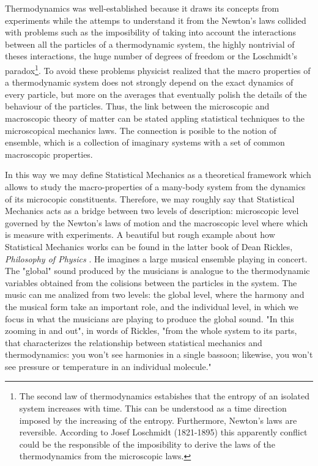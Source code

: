 \documentclass[a4paper,openright,12pt]{book}
\begin{document}
Thermodynamics was well-established because it draws its concepts from experiments while the attemps to understand it from the Newton's laws collided with problems such as the imposibility of taking into account the interactions between all the particles of a thermodynamic system, the highly nontrivial of theses interactions, the huge number of degrees of freedom or the Loschmidt's paradox\footnote{The second law of thermodynamics estabishes that the entropy of an isolated system increases with time. This can be understood as a time direction imposed by the increasing of the entropy. Furthermore, Newton's laws are reversible. According to Josef Loschmidt (1821-1895) this apparently conflict could be the responsible of the imposibility to derive the laws of the thermodynamics from the microscopic laws.}. 
To avoid these problems physicist realized that the macro properties of a thermodynamic system does not strongly depend on the exact dynamics of every particle, but more on the averages that eventually polish the details of the behaviour of the particles. 
Thus, the link between the microscopic and macroscopic theory of matter can be stated appling statistical techniques to the microscopical mechanics laws. 
The connection is posible to the notion of ensemble, which is a collection of imaginary systems with a set of common macroscopic properties.  

In this way we may define Statistical Mechanics as a theoretical framework which allows to study the macro-properties of a many-body system from the dynamics of its microcopic constituents.
Therefore, we may roughly say that Statistical Mechanics acts as a bridge between two levels of description: microscopic level governed by the Newton's laws of motion and the macroscopic level where which is measure with experiments.
A beautiful but rough example about how Statistical Mechanics works can be found in the latter book of Dean Rickles, {\it Philosophy of Physics} \cite{Rickles2016}.
He imagines a large musical ensemble playing in concert.
The "global" sound produced by the musicians is analogue to the thermodynamic variables obtained from the colisions between the particles in the system. 
The music can me analized from two levels: the global level, where the harmony and the musical form take an important role, and the individual level, in which we focus in what the musicians are playing to produce the global sound. "In this zooming in and out", in words of Rickles, "from the whole system to its parts, that characterizes the relationship between statistical mechanics and thermodynamics: you won't see harmonies in a single bassoon; likewise, you won't see pressure or temperature in an individual molecule."
\end{document}
